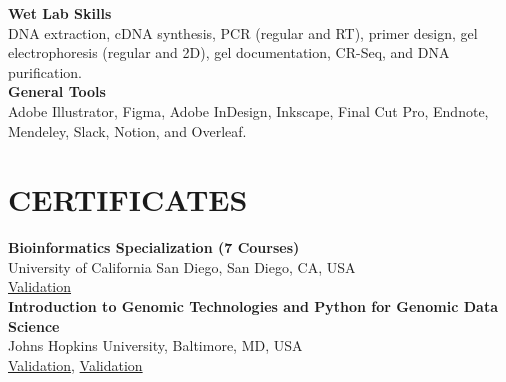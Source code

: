 \documentclass[a4paper,9pt]{extarticle}
\begin{document}
\noindent
\textbf{Wet Lab Skills} \\
DNA extraction, cDNA synthesis, PCR (regular and RT), primer design, gel electrophoresis (regular and 2D), gel documentation, CR-Seq, and DNA purification. \\

\noindent
\textbf{General Tools} \\
Adobe Illustrator, Figma, Adobe InDesign, Inkscape, Final Cut Pro, Endnote, Mendeley, Slack, Notion, and Overleaf.



\section*{CERTIFICATES}

\noindent
\newline
\textbf{Bioinformatics Specialization (7 Courses)} \\
University of California San Diego, San Diego, CA, USA\\ \href{https://www.coursera.org/account/accomplishments/specialization/EV4TMKLBTG63}{Validation}\\

\noindent
\textbf{Introduction to Genomic Technologies and Python for Genomic Data Science} \\
Johns Hopkins University, Baltimore, MD, USA\\
\href{https://www.coursera.org/account/accomplishments/records/R52ZVQVWLBUG}{Validation}, \href{https://www.coursera.org/account/accomplishments/records/83F8LA8HLETP}{Validation}\\

\end{document}
